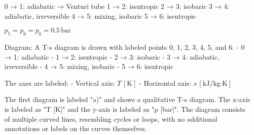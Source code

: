 0 → 1: adiabatic → Venturi tube  
1 → 2: isentropic  
2 → 3: isobaric  
3 → 4: adiabatic, irreversible  
4 → 5: mixing, isobaric  
5 → 6: isentropic  

\( p_5 = p_6 = p_0 = 0.5 \, \text{bar} \)  

Diagram:  
A T-s diagram is drawn with labeled points 0, 1, 2, 3, 4, 5, and 6.  
- 0 → 1: adiabatic  
- 1 → 2: isentropic  
- 2 → 3: isobaric  
- 3 → 4: adiabatic, irreversible  
- 4 → 5: mixing, isobaric  
- 5 → 6: isentropic  

The axes are labeled:  
- Vertical axis: \( T \, [\text{K}] \)  
- Horizontal axis: \( s \, [\text{kJ/kg·K}] \)

The first diagram is labeled "a)" and shows a qualitative T-s diagram. The x-axis is labeled as "T [K]" and the y-axis is labeled as "p [bar]". The diagram consists of multiple curved lines, resembling cycles or loops, with no additional annotations or labels on the curves themselves.